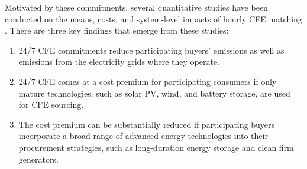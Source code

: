 \documentclass[pdflatex,sn-basic, Numbered]{sn-jnl}
\theoremstyle{thmstyleone}%
\theoremstyle{thmstyletwo}%
\theoremstyle{thmstylethree}%
\begin{document}
Motivated by these commitments, several quantitative studies have been conducted on the means, costs, and system-level impacts of hourly CFE matching \cite{xu-247CFE-report, ieaAdvancingDecarbonisationClean2022, riepinMeansCostsSystemlevel2024}. There are three key findings that emerge from these studies:
\begin{enumerate}
    \item 24/7 CFE commitments reduce participating buyers' emissions as well as emissions from the electricity grids where they operate.
    \item 24/7 CFE comes at a cost premium for participating consumers if only mature technologies, such as solar PV, wind, and battery storage, are used for CFE sourcing.
    \item The cost premium can be substantially reduced if participating buyers incorporate a broad range of advanced energy technologies into their procurement strategies, such as long-duration energy storage and clean firm generators.
\end{enumerate}
\end{document}

